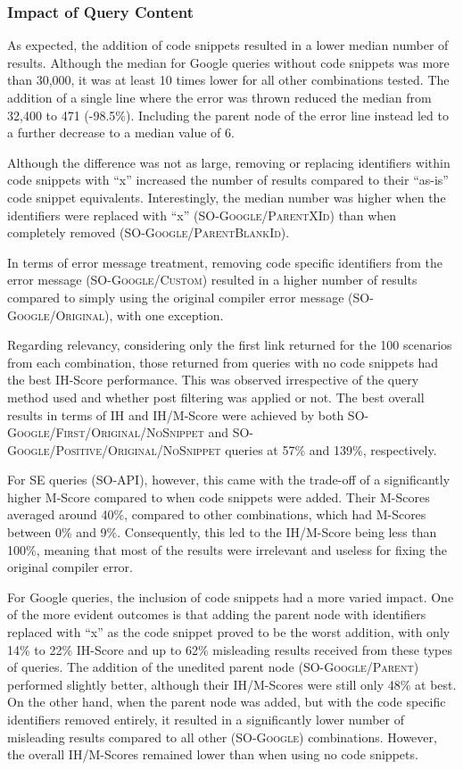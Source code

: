 \documentclass[preprint,12pt]{elsarticle}
\begin{document}
\subsubsection{Impact of Query Content}

As expected, the addition of code snippets resulted in a lower median number of results. Although the median for Google queries without code snippets was more than 30,000, it was at least 10 times lower for all other combinations tested. The addition of a single line where the error was thrown reduced the median from 32,400 to 471 (-98.5\%). Including the parent node of the error line instead led to a further decrease to a median value of 6.

Although the difference was not as large, removing or replacing identifiers within code snippets with ``x'' increased the number of results compared to their ``as-is'' code snippet equivalents. Interestingly, the median number was higher when the identifiers were replaced with ``x'' (\textsc{SO-Google/ParentXId}) than when completely removed (\textsc{SO-Google/ParentBlankId}).

In terms of error message treatment, removing code specific identifiers from the error message (\textsc{SO-Google/Custom}) resulted in a higher number of results compared to simply using the original compiler error message (\textsc{SO-Google/Original}), with one exception.

Regarding relevancy, considering only the first link returned for the 100 scenarios from each combination, those returned from queries with no code snippets had the best IH-Score performance. This was observed irrespective of the query method used and whether post filtering was applied or not. The best overall results in terms of IH and IH/M-Score were achieved by both \textsc{SO-Google/First/Original/NoSnippet} and \textsc{SO-Google/Positive/Original/NoSnippet} queries at 57\% and 139\%, respectively.

For SE queries (\textsc{SO-API}), however, this came with the trade-off of a significantly higher M-Score compared to when code snippets were added. Their M-Scores averaged around 40\%, compared to other combinations, which had M-Scores between 0\% and 9\%. Consequently, this led to the IH/M-Score being less than 100\%, meaning that most of the results were irrelevant and useless for fixing the original compiler error.

For Google queries, the inclusion of code snippets had a more varied impact. One of the more evident outcomes is that adding the parent node with identifiers replaced with ``x'' as the code snippet proved to be the worst addition, with only 14\% to 22\% IH-Score and up to 62\% misleading results received from these types of queries. The addition of the unedited parent node (\textsc{SO-Google/Parent}) performed slightly better, although their IH/M-Scores were still only 48\% at best. On the other hand, when the parent node was added, but with the code specific identifiers removed entirely, it resulted in a significantly lower number of misleading results compared to all other (\textsc{SO-Google}) combinations. However, the overall IH/M-Scores remained lower than when using no code snippets.
\end{document}
